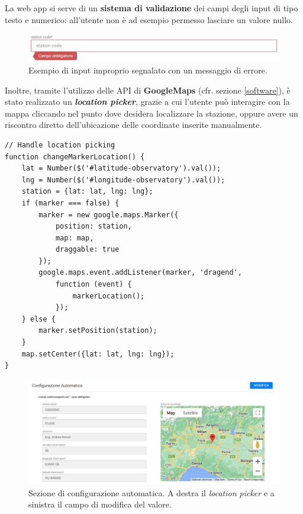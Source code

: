 La web app si serve di un \textbf{sistema di validazione} dei campi degli input di tipo testo e numerico: all'utente non è ad esempio permesso lasciare un valore nullo. 

\begin{figure}[H]
    \begin{center}
    \includegraphics[width=\textwidth]{images/validator.jpg}
    \caption{Esempio di input improprio segnalato con un messaggio di errore.}
    \end{center}
\end{figure}

Inoltre, tramite l'utilizzo delle API di \textbf{GoogleMaps} (cfr. sezione \ref{software}), è stato realizzato un \textbf{\emph{location picker}}, grazie a cui l'utente può interagire con la mappa cliccando nel punto dove desidera localizzare la stazione, oppure avere un riscontro diretto dell'ubicazione delle coordinate inserite manualmente.

\begin{lstlisting}[style=JavaScript,caption={Parte dell'implementazione in JS per il \emph{location picker}.},captionpos=b,label={lst:location-picker}]
// Handle location picking
function changeMarkerLocation() {
    lat = Number($('#latitude-observatory').val());
    lng = Number($('#longitude-observatory').val());
    station = {lat: lat, lng: lng};
    if (marker === false) {
        marker = new google.maps.Marker({
            position: station,
            map: map,
            draggable: true
        });
        google.maps.event.addListener(marker, 'dragend', 
            function (event) {
                markerLocation();
            });
    } else {
        marker.setPosition(station);
    }
    map.setCenter({lat: lat, lng: lng});
}
\end{lstlisting}

\begin{figure}[H]
    \begin{center}
    \includegraphics[width=\textwidth]{images/conf-automatica.jpg}
    \caption{Sezione di configurazione automatica. A destra il \emph{location picker} e a sinistra il campo di modifica del valore.}
    \end{center}
\end{figure}